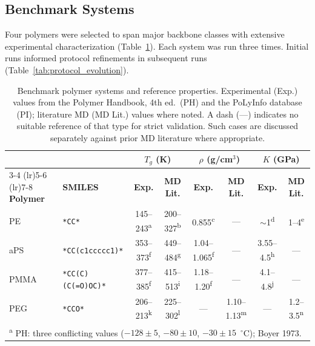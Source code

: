 \documentclass[journal=acsami,manuscript=article]{achemso}
\begin{document}
\subsection{Benchmark Systems}

Four polymers were selected to span major backbone classes with extensive experimental characterization (Table~\ref{tab:benchmarks}).
Each system was run three times. Initial runs informed protocol refinements in subsequent runs (Table~\ref{tab:protocol_evolution}).

\begin{table}[ht]
\centering
\caption{Benchmark polymer systems and reference properties.
Experimental (Exp.) values from the Polymer Handbook, 4th ed.\ (PH)\cite{brandrup1999polymerhandbook} and the PoLyInfo database (PI);\cite{otsuka2011polyinfo}
literature MD (MD Lit.) values where noted. A dash (---) indicates no suitable reference of that type for strict validation. Such cases are discussed separately against prior MD literature where appropriate.}
\label{tab:benchmarks}
\footnotesize
\begin{tabular}{ll cc cc cc}
\toprule
& & \multicolumn{2}{c}{\textbf{$T_g$ (K)}} & \multicolumn{2}{c}{\textbf{$\rho$ (g/cm$^3$)}} & \multicolumn{2}{c}{\textbf{$K$ (GPa)}} \\
\cmidrule(lr){3-4} \cmidrule(lr){5-6} \cmidrule(lr){7-8}
\textbf{Polymer} & \textbf{SMILES} & \textbf{Exp.} & \textbf{MD Lit.} & \textbf{Exp.} & \textbf{MD Lit.} & \textbf{Exp.} & \textbf{MD Lit.} \\
\midrule
PE   & \texttt{*CC*}              & 145--243\textsuperscript{a} & 200--327\textsuperscript{b} & 0.855\textsuperscript{c} & ---          & $\sim$1\textsuperscript{d} & 1--4\textsuperscript{e} \\
aPS  & \texttt{*CC(c1ccccc1)*}    & 353--373\textsuperscript{f} & 449--484\textsuperscript{g} & 1.04--1.065\textsuperscript{f} & --- & 3.55--4.5\textsuperscript{h} & --- \\
PMMA & \texttt{*CC(C)(C(=O)OC)*}  & 377--385\textsuperscript{f} & 415--513\textsuperscript{i} & 1.18--1.20\textsuperscript{f} & ---  & 4.1--4.8\textsuperscript{j} & --- \\
PEG  & \texttt{*CCO*}             & 206--213\textsuperscript{k} & 225--302\textsuperscript{l} & ---  & 1.10--1.13\textsuperscript{m} & --- & 1.2--3.5\textsuperscript{n} \\
\bottomrule
\multicolumn{8}{l}{\scriptsize \textsuperscript{a} PH: three conflicting values ($-128\pm5$, $-80\pm10$, $-30\pm15$~$^\circ$C); Boyer 1973.\cite{boyer1973pe}} \\

\end{tabular}
\end{table}
\end{document}
